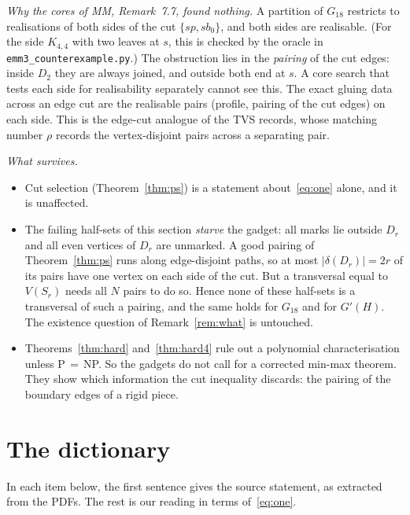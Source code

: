 \documentclass[11pt]{amsart}
\theoremstyle{definition}
\begin{document}
\emph{Why the cores of MM, Remark~7.7, found nothing.} A partition of $G_{18}$ restricts to
realisations of both sides of the cut $\{sp,sb_0\}$, and both sides are realisable. (For the side
$K_{4,4}$ with two leaves at $s$, this is checked by the oracle in
\texttt{emm3\_counterexample.py}.) The obstruction
lies in the \emph{pairing} of the cut edges: inside $D_2$ they are always joined, and outside both end
at $s$. A core search that tests each side for realisability separately cannot see this. The exact
gluing data across an edge cut are the realisable pairs (profile, pairing of the cut edges) on each
side. This is the edge-cut analogue of the TVS records, whose matching number $\rho$ records the
vertex-disjoint pairs across a separating pair.

\emph{What survives.}
\begin{itemize}
\item Cut selection (Theorem~\ref{thm:ps}) is a statement about~\eqref{eq:one} alone, and it is
unaffected.
\item The failing half-sets of this section \emph{starve} the gadget: all marks lie outside $D_r$ and
all even vertices of $D_r$ are unmarked. A good pairing of Theorem~\ref{thm:ps} runs along
edge-disjoint paths, so at most $|\delta(D_r)|=2r$ of its pairs have one vertex on each side of the
cut. But a transversal equal to $V(S_r)$ needs all $N$ pairs to do so. Hence none of these half-sets is
a transversal of such a pairing, and the same holds for $G_{18}$ and for $G'(H)$. The
existence question of Remark~\ref{rem:what} is untouched.
\item Theorems~\ref{thm:hard} and~\ref{thm:hard4} rule out a polynomial characterisation unless
P$\,=\,$NP. So the gadgets do not call for a corrected min-max theorem. They show which
information the cut inequality discards: the pairing of the boundary edges of a rigid piece.
\end{itemize}

\section{The dictionary}\label{sec:dictionary}

In each item below, the first sentence gives the source statement, as extracted from the PDFs. The
rest is our reading in terms of~\eqref{eq:one}.
\end{document}
